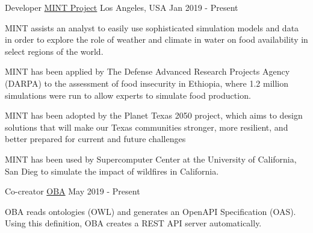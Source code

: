 \begin{cventries}
  \cventry
    {Developer}
    {\href{https://mintproject.readthedocs.io/en/stable/}{MINT Project}}
    {Los Angeles, USA}
    {Jan 2019 - Present}
    {
      \begin{cvitems}
        \item {MINT assists an analyst to easily use sophisticated simulation models and data in order to explore the role of weather and climate in water on food availability in select regions of the world.}
        \item {MINT has been applied by The Defense Advanced Research Projects Agency (DARPA) to the assessment of food insecurity in Ethiopia, where 1.2 million simulations were run to allow experts to simulate food production.}
        \item {MINT has been adopted by the Planet Texas 2050 project, which aims to design solutions that will make our Texas communities stronger, more resilient, and better prepared for current and future challenges}
        \item {MINT has been used by Supercomputer Center at the University of California, San Dieg to simulate the impact of wildfires in California.}
      \end{cvitems}
    }

  \cventry
      {Co-creator}
      {\href{https://github.com/KnowledgeCaptureAndDiscovery/OBA}{OBA}}
      {}
      {May 2019 - Present}
      {
        \begin{cvitems}
          \item {OBA reads ontologies (OWL) and generates an OpenAPI Specification (OAS). Using this definition, OBA creates a REST API server automatically.}
        \end{cvitems}
      }

\end{cventries}

